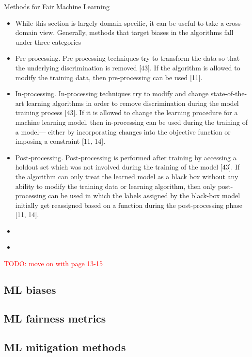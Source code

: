 \documentclass[12pt, a4paper, oneside]{book}   	%
\renewcommand{\todo}[1]{\textcolor{red}{TODO: #1}}
\begin{document}
			Methods for Fair Machine Learning
			
			\begin{itemize}
				\item While this section is largely domain-specific, it can be useful to take a cross-domain view. Generally, methods that target biases in the algorithms fall under three categories \autocite{Mehrabi_2021}
				\item Pre-processing. Pre-processing techniques try to transform the data so that the underlying discrimination is removed [43]. If the algorithm is allowed to modify the training data, then pre-processing can be used [11].\autocite{Mehrabi_2021}
				\item In-processing. In-processing techniques try to modify and change state-of-the-art learning algorithms in order to remove discrimination during the model training process [43]. If it is allowed to change the learning procedure for a machine learning model, then in-processing can be used during the training of a model— either by incorporating changes into the objective function or imposing a constraint [11, 14].\autocite{Mehrabi_2021}
				\item Post-processing. Post-processing is performed after training by accessing a holdout set which was not involved during the training of the model [43]. If the algorithm can only treat the learned model as a black box without any ability to modify the training data or learning algorithm, then only post-processing can be used in which the labels assigned by the black-box model initially get reassigned based on a function during the post-processing phase [11, 14].\autocite{Mehrabi_2021}
				\item \autocite{Mehrabi_2021}
				\item \autocite{Mehrabi_2021}
			\end{itemize}
			\todo{move on with page 13-15}
			
			\subsection{ML biases}
			
			\subsection{ML fairness metrics}
			
			\subsection{ML mitigation methods}
		
\end{document}
